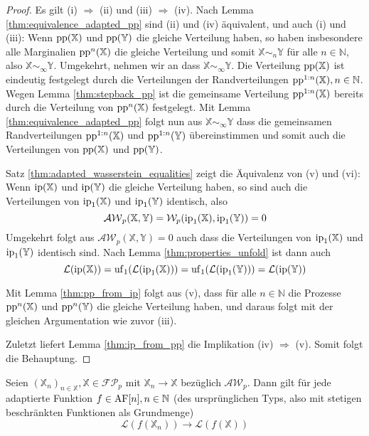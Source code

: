     \begin{proof}
        Es gilt (i) $\Rightarrow$ (ii) und (iii) $\Rightarrow$ (iv). Nach Lemma \ref{thm:equivalence_adapted_pp} sind (ii) und (iv) äquivalent, und auch (i) und (iii): Wenn $\operatorname{pp}(\mathbb{X})$ und $\operatorname{pp}(\mathbb{Y})$ die gleiche Verteilung haben, so haben insbesondere alle Marginalien $\operatorname{pp}^n(\mathbb{X})$ die gleiche Verteilung und somit $\mathbb{X}\sim_n \mathbb{Y}$ für alle $n\in\mathbb{N}$, also $\mathbb{X} \sim_{\infty} \mathbb{Y}$. Umgekehrt, nehmen wir an dass $\mathbb{X}\sim_{\infty}\mathbb{Y}$. Die Verteilung $\operatorname{pp}(\mathbb{X})$ ist eindeutig festgelegt durch die Verteilungen der Randverteilungen $\operatorname{pp}^{1:n}(\mathbb{X}), n\in\mathbb{N}$. Wegen Lemma \ref{thm:stepback_pp} ist die gemeinsame Verteilung $\operatorname{pp}^{1:n}(\mathbb{X})$ bereits durch die Verteilung von $\operatorname{pp}^n(\mathbb{X})$ festgelegt. Mit Lemma \ref{thm:equivalence_adapted_pp} folgt nun aus $\mathbb{X} \sim_\infty\mathbb{Y}$ dass die gemeinsamen Randverteilungen $\operatorname{pp}^{1:n}(\mathbb{X})$ und $\operatorname{pp}^{1:n}(\mathbb{Y})$ übereinstimmen und somit auch die Verteilungen von $\operatorname{pp}(\mathbb{X})$ und $\operatorname{pp}(\mathbb{Y})$.

        Satz \ref{thm:adapted_wasserstein_equalities} zeigt die Äquivalenz von (v) und (vi): Wenn $\operatorname{ip}(\mathbb{X})$ und $\operatorname{ip}(\mathbb{Y})$ die gleiche Verteilung haben, so sind auch die Verteilungen von $\operatorname{ip}_1(\mathbb{X})$ und $\operatorname{ip}_1(\mathbb{Y})$ identisch, also
        $$\mathcal{AW}_p(\mathbb{X,Y}) = \mathcal{W}_p(\operatorname{ip}_1(\mathbb{X}), \operatorname{ip}_1(\mathbb{Y})) = 0$$
        Umgekehrt folgt aus $\mathcal{AW}_p(\mathbb{X}, \mathbb{Y})=0$ auch dass die Verteilungen von $\operatorname{ip}_1(\mathbb{X})$ und $\operatorname{ip}_1(\mathbb{Y})$ identisch sind. Nach Lemma \ref{thm:properties_unfold} ist dann auch
        $$\mathcal{L}(\operatorname{ip}(\mathbb{X})) = \operatorname{uf}_1(\mathcal{L}(\operatorname{ip}_1(\mathbb{X}))) = \operatorname{uf}_1(\mathcal{L}(\operatorname{ip}_1(\mathbb{Y}))) = \mathcal{L}(\operatorname{ip}(\mathbb{Y}))$$

        Mit Lemma \ref{thm:pp_from_ip} folgt aus (v), dass für alle $n\in\mathbb{N}$ die Prozesse $\operatorname{pp}^n(\mathbb{X})$ und $\operatorname{pp}^n(\mathbb{Y})$ die gleiche Verteilung haben, und daraus folgt mit der gleichen Argumentation wie zuvor (iii).

        Zuletzt liefert Lemma \ref{thm:ip_from_pp} die Implikation (iv) $\Rightarrow$ (v). Somit folgt die Behauptung.
    \end{proof}
    \begin{proposition}\label{thm:adapted_continuity}
        Seien $(\mathbb{X}_n)_{n\in\mathbb{X}}, \mathbb{X} \in \mathcal{FP}_p$ mit $\mathbb{X}_n \rightarrow \mathbb{X}$ bezüglich $\mathcal{AW}_p$. Dann gilt für jede adaptierte Funktion $f \in \operatorname{AF}[n], n \in \mathbb{N}$ (des ursprünglichen Typs, also mit stetigen beschränkten Funktionen als Grundmenge) 
        $$\mathcal{L}(f(\mathbb{X}_n)) \rightarrow \mathcal{L}(f(\mathbb{X}))$$
    \end{proposition}
